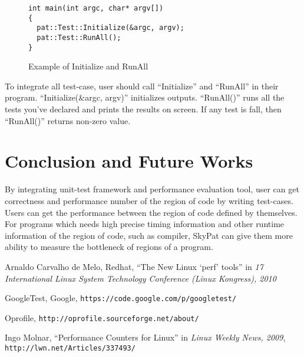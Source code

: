 \documentclass[final]{ols}
\begin{document}
\begin{figure}[h]
\lstset{language=C++}
\begin{lstlisting}[frame=single]
int main(int argc, char* argv[])
{
  pat::Test::Initialize(&argc, argv);
  pat::Test::RunAll();
}
\end{lstlisting}
\caption{Example of Initialize and RunAll}
\label{main_example}
\end{figure}

To integrate all test-case, user should call ``Initialize'' and ``RunAll'' in their program.
``Initialize(\&argc, argv)'' initializes outputs.
``RunAll()'' runs all the tests you've declared and prints the results on screen.
If any test is fall, then ``RunAll()'' returns non-zero value.

\section{Conclusion and Future Works}
By integrating unit-test framework and performance evaluation tool, user can get correctness and performance number of the region of code by writing test-cases.
Users can get the performance between the region of code defined by themselves.
For programs which needs high precise timing information and other runtime information of the region of code, such as compiler, SkyPat can give them more ability to measure the bottleneck of regions of a program.

\begin{thebibliography}{99}  %
Arnaldo Carvalho de Melo, Redhat, ``The New Linux `perf' tools'' in \emph{17 International Linux System Technology Conference (Linux Kongress), 2010}

GoogleTest, Google, \texttt{\small https://code.google.com/p/googletest/}

Oprofile, \texttt{\small \newline http://oprofile.sourceforge.net/about/}

Ingo Molnar, ``Performance Counters for Linux'' in \emph{Linux Weekly News, 2009}, \texttt{\small http://lwn.net/Articles/337493/}

\end{thebibliography}
\end{document}
